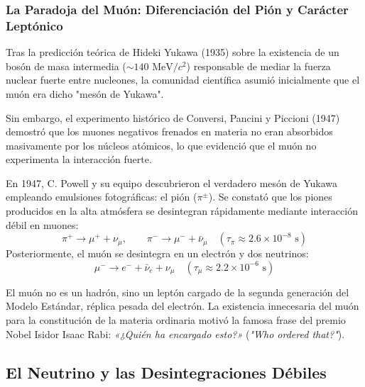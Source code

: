 \newpage
\subsubsection{La Paradoja del Muón: Diferenciación del Pión y Carácter Leptónico}

Tras la predicción teórica de Hideki Yukawa (1935) sobre la existencia de un bosón de masa intermedia ($\sim 140 \text{ MeV}/c^2$) responsable de mediar la fuerza nuclear fuerte entre nucleones, la comunidad científica asumió inicialmente que el muón era dicho "mesón de Yukawa".

Sin embargo, el experimento histórico de Conversi, Pancini y Piccioni (1947) demostró que los muones negativos frenados en materia no eran absorbidos masivamente por los núcleos atómicos, lo que evidenció que el muón no experimenta la interacción fuerte.

\begin{observacion}
En 1947, C. Powell y su equipo descubrieron el verdadero mesón de Yukawa empleando emulsiones fotográficas: el pión ($\pi^\pm$). Se constató que los piones producidos en la alta atmósfera se desintegran rápidamente mediante interacción débil en muones:
\begin{equation}
\pi^+ \longrightarrow \mu^+ + \nu_\mu, \qquad \pi^- \longrightarrow \mu^- + \bar{\nu}_\mu \quad (\tau_\pi \approx 2.6 \times 10^{-8} \text{ s})
\end{equation}
Posteriormente, el muón se desintegra en un electrón y dos neutrinos:
\begin{equation}
\mu^- \longrightarrow e^- + \bar{\nu}_e + \nu_\mu \quad (\tau_\mu \approx 2.2 \times 10^{-6} \text{ s})
\end{equation}

El muón no es un hadrón, sino un leptón cargado de la segunda generación del Modelo Estándar, réplica pesada del electrón. La existencia innecesaria del muón para la constitución de la materia ordinaria motivó la famosa frase del premio Nobel Isidor Isaac Rabi: \emph{«¿Quién ha encargado esto?»} (\emph{"Who ordered that?"}).
\end{observacion}

\newpage

\subsection{El Neutrino y las Desintegraciones Débiles}


